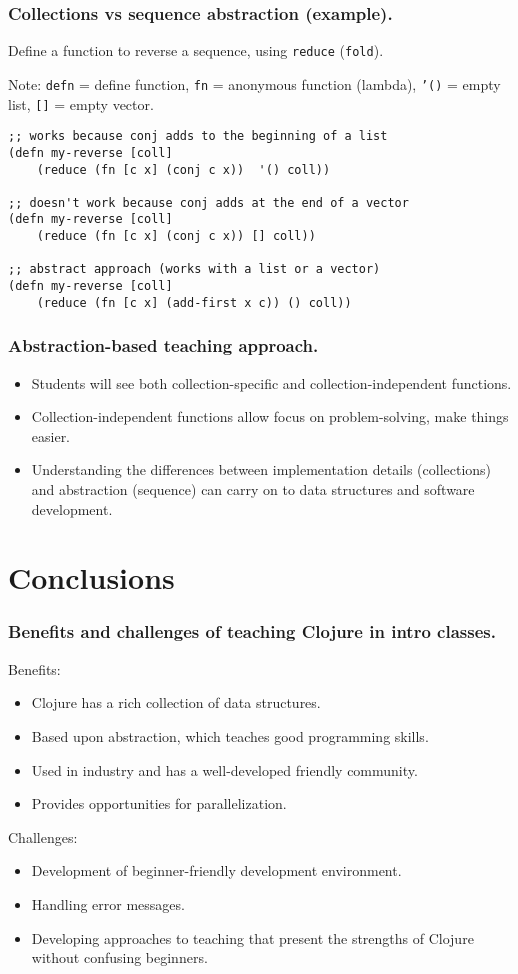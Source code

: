 \documentclass{beamer}
\begin{document}
\begin{frame}[fragile]
\frametitle{Collections vs sequence abstraction (example).}
Define a function to reverse a sequence, using {\tt reduce}  ({\tt fold}). 

Note: {\tt defn} = define function, {\tt fn} = anonymous function (lambda),  {\tt '()} = empty list, {\tt []} = empty vector. 
\begin{verbatim}
;; works because conj adds to the beginning of a list
(defn my-reverse [coll]
    (reduce (fn [c x] (conj c x))  '() coll)) 

;; doesn't work because conj adds at the end of a vector
(defn my-reverse [coll]
    (reduce (fn [c x] (conj c x)) [] coll)) 

;; abstract approach (works with a list or a vector)
(defn my-reverse [coll]
    (reduce (fn [c x] (add-first x c)) () coll)) 
\end{verbatim}
\end{frame}

\begin{frame}
\frametitle{Abstraction-based teaching approach.}
\begin{itemize}
\item Students will see both collection-specific and collection-independent functions. 
\item Collection-independent functions allow focus on problem-solving, make things easier. 
\item Understanding the differences between implementation details (collections) and abstraction (sequence) can carry on to data structures and software development. 
\end{itemize}
\end{frame}

\section{Conclusions}

\begin{frame}
\frametitle{Benefits and challenges of teaching Clojure in intro classes.}
Benefits:
\begin{itemize}
\item Clojure has a rich collection of data structures.
\item Based upon abstraction, which teaches good programming skills. 
\item Used in industry and has a well-developed friendly community. 
\item Provides opportunities for parallelization. 
\end{itemize}
Challenges:
\begin{itemize}
\item Development of beginner-friendly development environment. 
\item Handling error messages.
\item Developing approaches to teaching that present the strengths of Clojure without confusing beginners. 
\end{itemize}
\end{frame}
\end{document}
